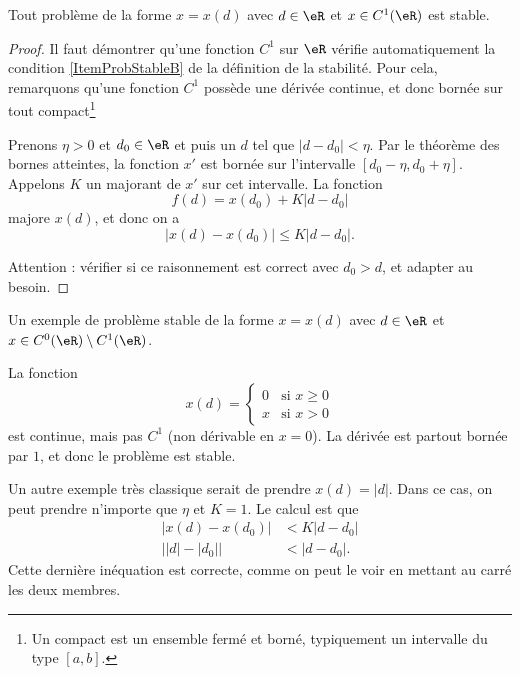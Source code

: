 \begin{lemma}   \label{LemITCxqyS}
	 Tout  problème de la forme $x=x(d)$ avec $d\in\eR$ et $x \in C^1(\eR)$ est stable.
\end{lemma}

\begin{proof}
	Il faut démontrer qu'une fonction $C^1$ sur $\eR$ vérifie automatiquement la condition \ref{ItemProbStableB} de la définition de la stabilité. Pour cela, remarquons qu'une fonction $C^1$ possède une dérivée continue, et donc bornée sur tout compact\footnote{Un compact est un ensemble fermé et borné, typiquement un intervalle du type $[a,b]$.}

	Prenons $\eta>0$ et $d_0\in\eR$ et puis un $d$ tel que $| d-d_0 |<\eta$. Par le théorème des bornes atteintes, la fonction $x'$ est bornée sur l'intervalle $[d_0-\eta,d_0+\eta]$. Appelons $K$ un majorant de $x'$ sur cet intervalle. La fonction
	\begin{equation}
		f(d)=x(d_0)+K| d-d_0 |
	\end{equation}
	majore $x(d)$, et donc on a 
	\begin{equation}
		\big| x(d)-x(d_0) \big|\leq K| d-d_0 |.
	\end{equation}

	Attention : vérifier si ce raisonnement est correct avec $d_0>d$, et adapter au besoin.
\end{proof}

\begin{example} \label{ExRZrOeoi}
    Un exemple de problème stable de la forme  $x=x(d)$ avec $d\in\eR$ et $x \in C^0(\eR)\setminus C^1(\eR)$.

	La fonction
	\begin{equation}
		x(d)=\begin{cases}
			0	&	\text{si $x\geq 0$}\\
			x	&	 \text{si $x>0$}
		\end{cases}
	\end{equation}
	est continue, mais pas $C^1$ (non dérivable en $x=0$). La dérivée est partout bornée par $1$, et donc le problème est stable.

	Un autre exemple très classique serait de prendre $x(d)=| d |$. Dans ce cas, on peut prendre n'importe que $\eta$ et $K=1$. Le calcul est que
	\begin{subequations}
		\begin{align}
			| x(d)-x(d_0) |&<K| d-d_0 |\\
			\big| | d |-| d_0 | \big|&<| d-d_0 |.
		\end{align}
	\end{subequations}
	Cette dernière inéquation est correcte, comme on peut le voir en mettant au carré les deux membres.

\end{example}

